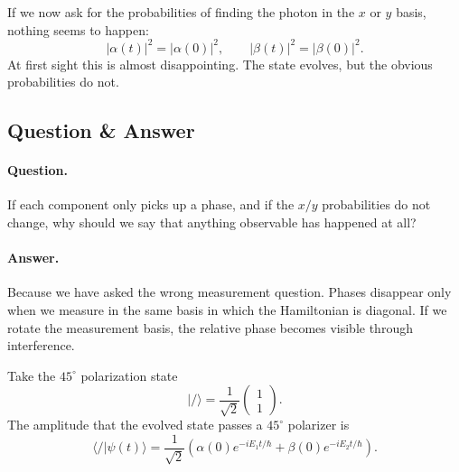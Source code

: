 If we now ask for the probabilities of finding the photon in the $x$ or $y$ basis, nothing seems to happen:
\begin{equation}
|\alpha(t)|^2=|\alpha(0)|^2,
\qquad
|\beta(t)|^2=|\beta(0)|^2.
\end{equation}
At first sight this is almost disappointing. The state evolves, but the obvious probabilities do not.

\subsection{Question \& Answer}

\paragraph{Question.}
If each component only picks up a phase, and if the $x/y$ probabilities do not change, why should we say that anything observable has happened at all?

\paragraph{Answer.}
Because we have asked the wrong measurement question. Phases disappear only when we measure in the same basis in which the Hamiltonian is diagonal. If we rotate the measurement basis, the relative phase becomes visible through interference.

Take the $45^\circ$ polarization state
\begin{equation}
|/\rangle=\frac{1}{\sqrt2}
\begin{pmatrix}
1\\
1
\end{pmatrix}.
\end{equation}
The amplitude that the evolved state passes a $45^\circ$ polarizer is
\begin{equation}
\langle /|\psi(t)\rangle
=
\frac{1}{\sqrt2}
\left(
\alpha(0)e^{-iE_1 t/\hbar}
+
\beta(0)e^{-iE_2 t/\hbar}
\right).
\end{equation}

